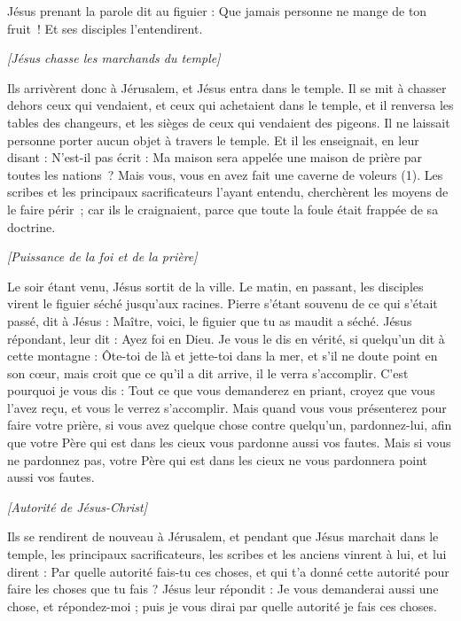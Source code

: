\begin{multicols}{2}
Jésus prenant la parole dit au figuier : Que jamais personne ne mange de ton fruit ! Et ses disciples l'entendirent.
\begin{center}
\textit{[Jésus chasse les marchands du temple]}
\end{center}
\PPE{}
Ils arrivèrent donc à Jérusalem, et Jésus entra dans le temple. Il se mit à chasser dehors ceux qui vendaient, et ceux qui achetaient dans le temple, et il renversa les tables des changeurs, et les sièges de ceux qui vendaient des pigeons.
Il ne laissait personne porter aucun objet à travers le temple.
Et il les enseignait, en leur disant : N'est-il pas écrit : Ma maison sera appelée une maison de prière par toutes les nations ? Mais vous, vous en avez fait une caverne de voleurs (1).
Les scribes et les principaux sacrificateurs l’ayant entendu, cherchèrent les moyens de le faire périr ; car ils le craignaient, parce que toute la foule était frappée de sa doctrine.
\begin{center}
\textit{[Puissance de la foi et de la prière]}
\end{center}
\PPE{}
Le soir étant venu, Jésus sortit de la ville.
Le matin, en passant, les disciples virent le figuier séché jusqu’aux racines.
Pierre s'étant souvenu de ce qui s'était passé, dit à Jésus : Maître, voici, le figuier que tu as maudit a séché.
Jésus répondant, leur dit : Ayez foi en Dieu.
Je vous le dis en vérité, si quelqu’un dit à cette montagne : Ôte-toi de là et jette-toi dans la mer, et s’il ne doute point en son cœur, mais croit que ce qu’il a dit arrive, il le verra s’accomplir.
C'est pourquoi je vous dis : Tout ce que vous demanderez en priant, croyez que vous l’avez reçu, et vous le verrez s’accomplir.
Mais quand vous vous présenterez pour faire votre prière, si vous avez quelque chose contre quelqu'un, pardonnez-lui, afin que votre Père qui est dans les cieux vous pardonne aussi vos fautes.
Mais si vous ne pardonnez pas, votre Père qui est dans les cieux ne vous pardonnera point aussi vos fautes.
\begin{center}
\textit{[Autorité de Jésus-Christ]}
\end{center}
\PPE{}
Ils se rendirent de nouveau à Jérusalem, et pendant que Jésus marchait dans le temple, les principaux sacrificateurs, les scribes et les anciens vinrent à lui,
et lui dirent : Par quelle autorité fais-tu ces choses, et qui t'a donné cette autorité pour faire les choses que tu fais ?
Jésus leur répondit : Je vous demanderai aussi une chose, et répondez-moi ; puis je vous dirai par quelle autorité je fais ces choses.

\end{multicols}
